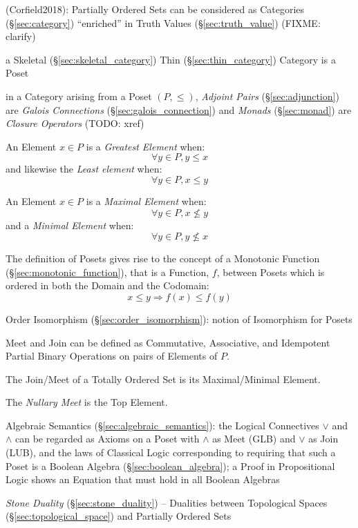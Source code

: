 (Corfield2018): Partially Ordered Sets can be considered as Categories
(\S\ref{sec:category}) ``enriched'' in Truth Values (\S\ref{sec:truth_value})
(FIXME: clarify)

a Skeletal (\S\ref{sec:skeletal_category}) Thin (\S\ref{sec:thin_category})
Category is a Poset

in a Category arising from a Poset $(P,\leq)$, \emph{Adjoint Pairs}
(\S\ref{sec:adjunction}) are \emph{Galois Connections}
(\S\ref{sec:galois_connection}) and \emph{Monads} (\S\ref{sec:monad}) are
\emph{Closure Operators} (TODO: xref)

An Element $x \in P$ is a \emph{Greatest Element} when:
\[
  \forall y \in P, y \leq x
\]
and likewise the \emph{Least element} when:
\[
  \forall y \in P, x \leq y
\]

An Element $x \in P$ is a \emph{Maximal Element} when:
\[
  \forall y \in P, x \nleq y
\]
and a \emph{Minimal Element} when:
\[
  \forall y \in P, y \nleq x
\]

The definition of Posets gives rise to the concept of a Monotonic
Function (\S\ref{sec:monotonic_function}), that is a Function, $f$,
between Posets which is ordered in both the Domain and the Codomain:
\[
  x \leq y \Rightarrow f(x) \leq f(y)
\]

Order Isomorphism (\S\ref{sec:order_isomorphism}): notion of
Isomorphism for Posets


Meet and Join can be defined as Commutative, Associative, and
Idempotent Partial Binary Operations on pairs of Elements of $P$.

The Join/Meet of a Totally Ordered Set is its Maximal/Minimal Element.

The \emph{Nullary Meet} is the Top Element.

\fist Algebraic Semantics (\S\ref{sec:algebraic_semantics}): the Logical
Connectives $\vee$ and $\wedge$ can be regarded as Axioms on a Poset with
$\wedge$ as Meet (GLB) and $\vee$ as Join (LUB), and the laws of Classical
Logic corresponding to requiring that such a Poset is a Boolean Algebra
(\S\ref{sec:boolean_algebra}); a Proof in Propositional Logic shows an Equation
that must hold in all Boolean Algebras

\fist \emph{Stone Duality} (\S\ref{sec:stone_duality}) -- Dualities between
Topological Spaces (\S\ref{sec:topological_space}) and Partially Ordered Sets



